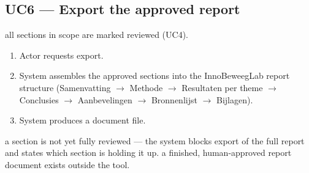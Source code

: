 \subsection{UC6 --- Export the approved report}
 all sections in scope are marked reviewed (UC4).
\begin{enumerate}
\item Actor requests export.
\item System assembles the approved sections into the InnoBeweegLab report structure (Samenvatting $\rightarrow$ Methode $\rightarrow$ Resultaten per theme $\rightarrow$ Conclusies $\rightarrow$ Aanbevelingen $\rightarrow$ Bronnenlijst $\rightarrow$ Bijlagen).
\item System produces a document file.
\end{enumerate}
 a section is not yet fully reviewed --- the system blocks export of the full report and states which section is holding it up.
 a finished, human-approved report document exists outside the tool.


